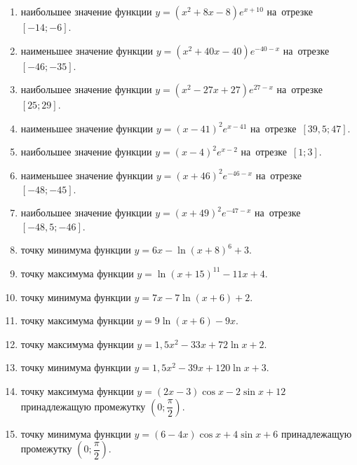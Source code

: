 \documentclass[a4paper,10pt]{article}
\begin{document}
\begin{enumerate}
\item {} наибольшее значение функции $y=\left(x^2 +8x -8\right)e^{x+10}$ на~отрезке~$\left[-14;-6\right]$.

\item {} наименьшее значение функции $y=\left(x^2 +40x -40\right)e^{-40-x}$ на~отрезке~$\left[-46;-35\right]$.

\item {} наибольшее значение функции $y=\left(x^2 -27x +27\right)e^{27-x}$ на~отрезке~$\left[25;29\right]$.

\item {} наименьшее значение функции $y=\left(x-41\right)^2e^{x-41}$ на~отрезке~$\left[39,5;47\right]$.

\item {} наибольшее значение функции $y=\left(x-4\right)^2e^{x-2}$ на~отрезке~$\left[1;3\right]$.

\item {} наименьшее значение функции $y=\left(x+46\right)^2e^{-46-x}$ на~отрезке~$\left[-48;-45\right]$.

\item {} наибольшее значение функции $y=\left(x+49\right)^2e^{-47-x}$ на~отрезке~$\left[-48,5;-46\right]$.

\item {} точку минимума функции $y=6x-\ln\left(x+8\right)^{6}+3$.

\item {} точку максимума функции $y=\ln\left(x+15\right)^{11}-11x+4$.

\item {} точку минимума функции $y=7x-7\ln\left(x+6\right)+2$.

\item {} точку максимума функции $y=9\ln\left(x+6\right)-9x$.

\item {} точку максимума функции $y=1,5x^2-33x+72\ln x +2$.

\item {} точку минимума функции $y=1,5x^2-39x+120\ln x +3$.

\item {} точку максимума функции $y=\left(2x-3\right)\cos x -2\sin x+12$
принадлежащую промежутку $\left(0;\dfrac{\pi}{2}\right)$.

\item {} точку минимума функции $y=\left(6-4x\right)\cos x +4\sin x+6$
принадлежащую промежутку $\left(0;\dfrac{\pi}{2}\right)$.


\end{enumerate}
\end{document}
